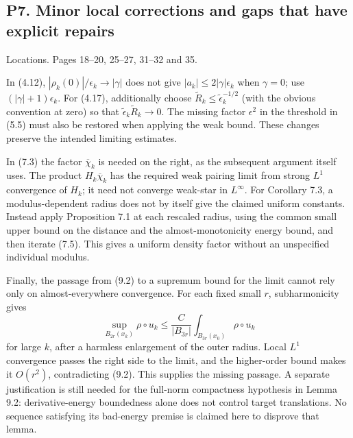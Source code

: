 \documentclass[10pt]{article}
\begin{document}
\subsection*{P7. Minor local corrections and gaps that have explicit repairs}
Locations. Pages 18–20, 25–27, 31–32 and 35.\par
In (4.12), \(|\rho_k(0)|/\epsilon_k\to|\gamma|\) does not give \(|a_k|\le2|\gamma|\epsilon_k\) when \(\gamma=0\); use \((|\gamma|+1)\epsilon_k\). For (4.17), additionally choose \(\widetilde R_k\le\widetilde\epsilon_k^{-1/2}\) (with the obvious convention at zero) so that \(\widetilde\epsilon_k\widetilde R_k\to0\). The missing factor \(\epsilon^2\) in the threshold in (5.5) must also be restored when applying the weak bound. These changes preserve the intended limiting estimates.\par
In (7.3) the factor \(\overline\chi_k\) is needed on the right, as the subsequent argument itself uses. The product \(H_k\overline\chi_k\) has the required weak pairing limit from strong \(L^1\) convergence of \(H_k\); it need not converge weak-star in \(L^\infty\). For Corollary 7.3, a modulus-dependent radius does not by itself give the claimed uniform constants. Instead apply Proposition 7.1 at each rescaled radius, using the common small upper bound on the distance and the almost-monotonicity energy bound, and then iterate (7.5). This gives a uniform density factor without an unspecified individual modulus.\par
Finally, the passage from (9.2) to a supremum bound for the limit cannot rely only on almost-everywhere convergence. For each fixed small \(r\), subharmonicity gives \[\sup_{B_{2r}(x_k)}\rho\circ u_k
 \le \frac{C}{|B_{3r}|}\int_{B_{3r}(x_0)}\rho\circ u_k\] for large \(k\), after a harmless enlargement of the outer radius. Local \(L^1\) convergence passes the right side to the limit, and the higher-order bound makes it \(O(r^2)\), contradicting (9.2). This supplies the missing passage. A separate justification is still needed for the full-norm compactness hypothesis in Lemma 9.2: derivative-energy boundedness alone does not control target translations. No sequence satisfying its bad-energy premise is claimed here to disprove that lemma.\par
\end{document}
